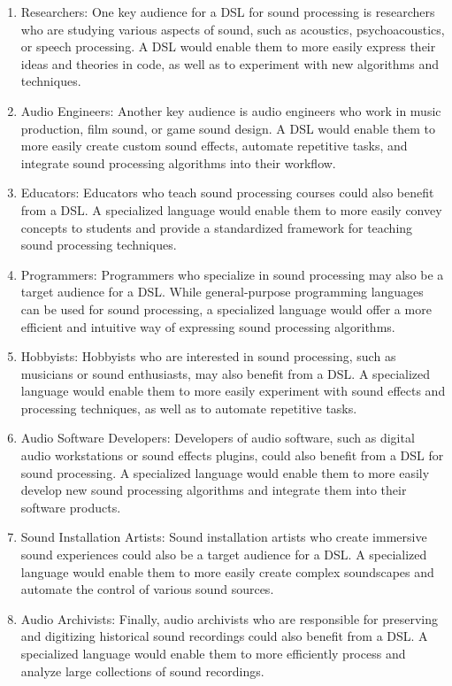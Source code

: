 \begin{enumerate}
\item Researchers: One key audience for a DSL for sound processing is researchers who are studying various aspects of sound, such as acoustics, psychoacoustics, or speech processing. A DSL would enable them to more easily express their ideas and theories in code, as well as to experiment with new algorithms and techniques.

\item Audio Engineers: Another key audience is audio engineers who work in music production, film sound, or game sound design. A DSL would enable them to more easily create custom sound effects, automate repetitive tasks, and integrate sound processing algorithms into their workflow.

\item Educators: Educators who teach sound processing courses could also benefit from a DSL. A specialized language would enable them to more easily convey concepts to students and provide a standardized framework for teaching sound processing techniques.

\item Programmers: Programmers who specialize in sound processing may also be a target audience for a DSL. While general-purpose programming languages can be used for sound processing, a specialized language would offer a more efficient and intuitive way of expressing sound processing algorithms.

\item Hobbyists: Hobbyists who are interested in sound processing, such as musicians or sound enthusiasts, may also benefit from a DSL. A specialized language would enable them to more easily experiment with sound effects and processing techniques, as well as to automate repetitive tasks.

\item Audio Software Developers: Developers of audio software, such as digital audio workstations or sound effects plugins, could also benefit from a DSL for sound processing. A specialized language would enable them to more easily develop new sound processing algorithms and integrate them into their software products.

\item Sound Installation Artists: Sound installation artists who create immersive sound experiences could also be a target audience for a DSL. A specialized language would enable them to more easily create complex soundscapes and automate the control of various sound sources.

\item Audio Archivists: Finally, audio archivists who are responsible for preserving and digitizing historical sound recordings could also benefit from a DSL. A specialized language would enable them to more efficiently process and analyze large collections of sound recordings.
\end{enumerate}

